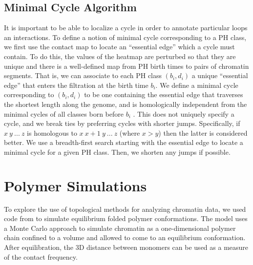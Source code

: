 \subsection{Minimal Cycle Algorithm}
\label{subsec:minimal_cycles}
%
It is important to be able to localize a cycle in order to annotate particular loops an interactions.
To define a notion of minimal cycle corresponding to a PH class, we first use the contact map to locate an ``essential edge'' which a cycle must contain.
To do this, the values of the heatmap are perturbed so that they are unique and there is a well-defined map from PH birth times to pairs of chromatin segments.
That is, we can associate to each PH class $(b_i, d_i)$ a unique ``essential edge'' that enters the filtration at the birth time $b_i$.
We define a minimal cycle corresponding to $(b_i,d_i)$ to be one containing the essential edge that traverses the shortest length along the genome, and is homologically independent from the minimal cycles of all classes born before $b_i$ \cite{Schweinhart:2015wr}.
This does not uniquely specify a cycle, and we break ties by preferring cycles with shorter jumps. 
Specifically, if $x~y~...~z$ is homologous to $x~x+1~y~...~z$ (where $x>y$) then the latter is considered better.
We use a breadth-first search starting with the essential edge to locate a minimal cycle for a given PH class.
Then, we shorten any jumps if possible.


\section{Polymer Simulations}
\label{sec:polymer_simulations}
%
To explore the use of topological methods for analyzing chromatin data, we used code from \cite{Doyle:2014ct} to simulate equilibrium folded polymer conformations.
The model uses a Monte Carlo approach to simulate chromatin as a one-dimensional polymer chain confined to a volume and allowed to come to an equilibrium conformation.
After equilibration, the 3D distance between monomers can be used as a measure of the contact frequency.

